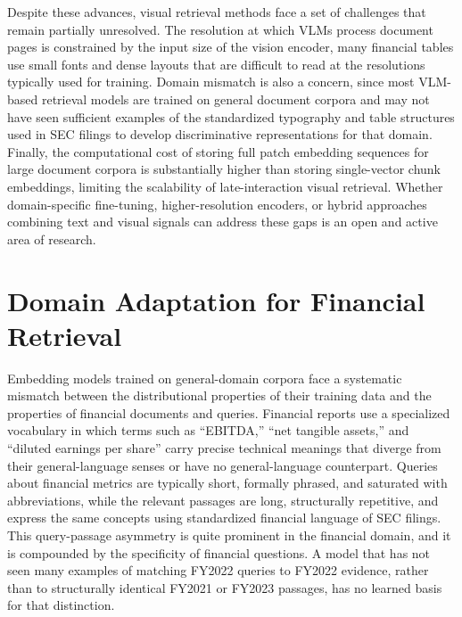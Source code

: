 \documentclass[12pt,twoside,maitrise]{dms}
\newcounter{example}
\theoremstyle{definition}
\numberwithin{equation}{section}
\numberwithin{table}{chapter}
\numberwithin{figure}{chapter}
\begin{document}
Despite these advances, visual retrieval methods face a set of challenges that remain
partially unresolved. The resolution at which VLMs process document pages is constrained
by the input size of the vision encoder, many financial tables use small fonts and dense
layouts that are difficult to read at the resolutions typically used for training. Domain
mismatch is also a concern, since most VLM-based retrieval models are trained on general
document corpora and may not have seen sufficient examples of the standardized typography
and table structures used in SEC filings to develop discriminative representations for
that domain. Finally, the computational cost of storing full patch embedding sequences
for large document corpora is substantially higher than storing single-vector chunk
embeddings, limiting the scalability of late-interaction visual retrieval. Whether
domain-specific fine-tuning, higher-resolution encoders, or hybrid approaches combining
text and visual signals can address these gaps is an open and active area of research.


\section{Domain Adaptation for Financial Retrieval}
\label{sec:domain_adaptation}

Embedding models trained on general-domain corpora face a systematic mismatch between
the distributional properties of their training data and the properties of financial
documents and queries. Financial reports use a specialized vocabulary in which terms such
as ``EBITDA,'' ``net tangible assets,'' and ``diluted earnings per share'' carry precise
technical meanings that diverge from their general-language senses or have no
general-language counterpart. Queries about financial metrics are typically short,
formally phrased, and saturated with abbreviations, while the relevant passages are long, structurally repetitive, and express the same concepts using standardized financial language of
SEC filings. This query-passage asymmetry is quite prominent in the financial domain, and it is compounded by the specificity of financial
questions. A model that has not seen many examples of matching FY2022 queries to FY2022
evidence, rather than to structurally identical FY2021 or FY2023 passages, has no
learned basis for that distinction.
\end{document}
